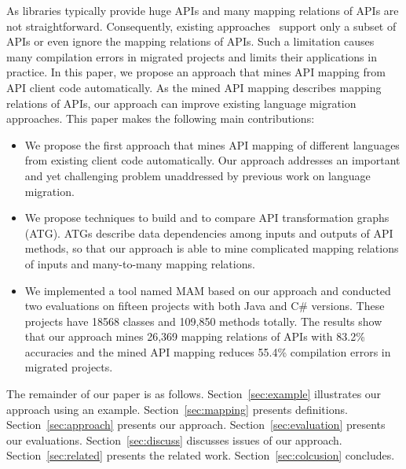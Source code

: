 As libraries typically provide huge APIs and many mapping relations
of APIs are not straightforward. Consequently, existing
approaches~\cite{mossienko2003automated,yasumatsu1995spice,hainaut2008migration}
support only a subset of APIs or even ignore the mapping relations
of APIs. Such a limitation causes many compilation errors in
migrated projects and limits their applications in practice. In this
paper, we propose an approach that mines API mapping from API client
code automatically. As the mined API mapping describes mapping
relations of APIs, our approach can improve existing language
migration approaches. This paper makes the following main
contributions:

\begin{itemize}\vspace*{-1.5ex}
\item We propose the first approach that mines API mapping of
different languages from existing client code automatically. Our
approach addresses an important and yet challenging problem
unaddressed by previous work on language migration.\vspace*{-1.5ex}
\item We propose techniques to build and to compare API
transformation graphs (ATG). ATGs describe data dependencies among
inputs and outputs of API methods, so that our approach is able to
mine complicated mapping relations of inputs and many-to-many
mapping relations.\vspace*{-1.5ex}
\item We
implemented a tool named MAM based on our approach and conducted two
evaluations on fifteen projects with both Java and C\# versions.
These projects have 18568 classes and 109,850 methods totally. The
results show that our approach mines 26,369 mapping relations of
APIs with 83.2\% accuracies and the mined API mapping reduces 55.4\%
compilation errors in migrated projects.
\end{itemize}\vspace*{-1.5ex}


The remainder of our paper is as follows. Section~\ref{sec:example}
illustrates our approach using an example. Section~\ref{sec:mapping}
presents definitions. Section~\ref{sec:approach} presents our
approach. Section~\ref{sec:evaluation} presents our evaluations.
Section~\ref{sec:discuss} discusses issues of our approach.
Section~\ref{sec:related} presents the related work.
Section~\ref{sec:colcusion} concludes.
